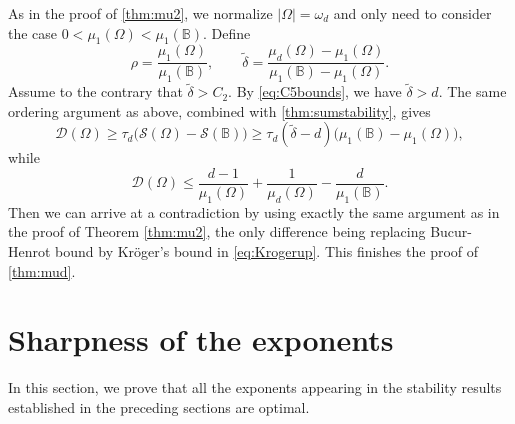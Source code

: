 \documentclass{amsart}
\numberwithin{equation}{section}
\theoremstyle{plain}
\theoremstyle{definition}
\theoremstyle{plain}
\theoremstyle{remark}
\numberwithin{figure}{section}
\newcommand{\B}{\mathbb{B}}
\newcommand{\D}{\mathcal{D}(\Omega)}
\newcommand{\s}{\mathcal{S}(\Omega)}
\begin{document}
As in the proof of \cref{thm:mu2}, we normalize $|\Omega|=\omega_d$ and only need to consider the case $0<\mu_1(\Omega)<\mu_1(\B)$. Define
\[
    \rho=\frac{\mu_1(\Omega)}{\mu_1(\B)},\qquad \widetilde{\delta}=\frac{\mu_d(\Omega)-\mu_1(\Omega)}{\mu_1(\B)-\mu_1(\Omega)}.
\]
Assume to the contrary that $\widetilde{\delta}>C_2$. By \cref{eq:C5bounds}, we have $\widetilde{\delta}>d$. The same ordering argument as above, combined with \cref{thm:sumstability}, gives
\[
    \D\geq\tau_d\big(\s-\mathcal{S}(\B)\big)\geq\tau_d(\widetilde{\delta}-d)\big(\mu_1(\B)-\mu_1(\Omega)\big),
\]
while
\[
    \D\leq\frac{d-1}{\mu_1(\Omega)}+\frac{1}{\mu_d(\Omega)}-\frac{d}{\mu_1(\B)}.
\]
Then we can arrive at a contradiction by using exactly the same argument as in the proof of Theorem \ref{thm:mu2}, the only difference being replacing Bucur-Henrot bound by  Kr\"oger's bound in \cref{eq:Krogerup}. This finishes the proof of \cref{thm:mud}.

\section{Sharpness of the exponents}

In this section, we prove that all the exponents appearing in the stability results established in the preceding sections are optimal.
\end{document}
